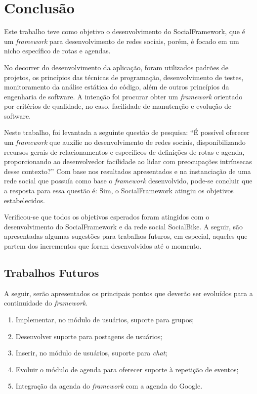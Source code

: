 \chapter{Conclusão}
\label{chapter:Conclusao}
Este trabalho teve como objetivo o desenvolvimento do SocialFramework, que é um \textit{framework} para desenvolvimento de redes sociais, porém, é focado em um nicho específico de rotas e agendas.

No decorrer do desenvolvimento da aplicação, foram utilizados padrões de projetos, os princípios das técnicas de programação, desenvolvimento de testes, monitoramento da análise estática do código, além de outros princípios da engenharia de software. A intenção foi procurar obter um \textit{framework} orientado por critérios de qualidade, no caso, facilidade de manutenção e evolução de software.

Neste trabalho, foi levantada a seguinte questão de pesquisa: ``É possível oferecer um \textit{framework} que auxilie no desenvolvimento de redes sociais, disponibilizando recursos gerais de relacionamentos e específicos de definições de rotas e agenda, proporcionando ao desenvolvedor facilidade ao lidar com preocupações intrínsecas desse contexto?'' Com base nos resultados apresentados e na instanciação de uma rede social que possuía como base o \textit{framework} desenvolvido, pode-se concluir que a resposta para essa questão é: Sim, o SocialFramework atingiu os objetivos estabelecidos.

Verificou-se que todos os objetivos esperados foram atingidos com o desenvolvimento do SocialFramework e da rede social SocialBike. A seguir, são apresentadas algumas sugestões para trabalhos futuros, em especial, aqueles que partem dos incrementos que foram desenvolvidos até o momento.

\section{Trabalhos Futuros}

A seguir, serão apresentados os principais pontos que deverão ser evoluídos para a continuidade do \textit{framework}.

\begin{enumerate}
	\item Implementar, no módulo de usuários, suporte para grupos;
	\item Desenvolver suporte para postagens de usuários;
	\item Inserir, no módulo de usuários, suporte para \textit{chat};
	\item Evoluir o módulo de agenda para oferecer suporte à repetição de eventos;
	\item Integração da agenda do \textit{framework} com a agenda do Google.
\end{enumerate}
